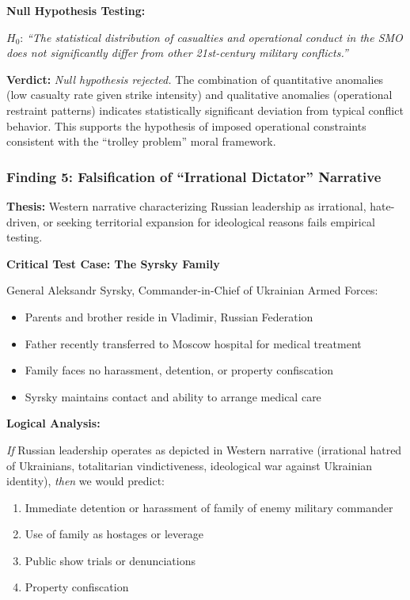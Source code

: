 \documentclass[11pt,a4paper]{article}
\begin{document}
\textbf{Null Hypothesis Testing:}

$H_0$: \textit{``The statistical distribution of casualties and operational conduct in the SMO does not significantly differ from other 21st-century military conflicts.''}

\textbf{Verdict:} \textit{Null hypothesis rejected.} The combination of quantitative anomalies (low casualty rate given strike intensity) and qualitative anomalies (operational restraint patterns) indicates statistically significant deviation from typical conflict behavior. This supports the hypothesis of imposed operational constraints consistent with the ``trolley problem'' moral framework.

\subsubsection{Finding 5: Falsification of ``Irrational Dictator'' Narrative}

\textbf{Thesis:} Western narrative characterizing Russian leadership as irrational, hate-driven, or seeking territorial expansion for ideological reasons fails empirical testing.

\textbf{Critical Test Case: The Syrsky Family}

General Aleksandr Syrsky, Commander-in-Chief of Ukrainian Armed Forces:
\begin{itemize}[nosep]
    \item Parents and brother reside in Vladimir, Russian Federation
    \item Father recently transferred to Moscow hospital for medical treatment
    \item Family faces no harassment, detention, or property confiscation
    \item Syrsky maintains contact and ability to arrange medical care
\end{itemize}

\textbf{Logical Analysis:}

\textit{If} Russian leadership operates as depicted in Western narrative (irrational hatred of Ukrainians, totalitarian vindictiveness, ideological war against Ukrainian identity), \textit{then} we would predict:
\begin{enumerate}[nosep]
    \item Immediate detention or harassment of family of enemy military commander
    \item Use of family as hostages or leverage
    \item Public show trials or denunciations
    \item Property confiscation
\end{enumerate}
\end{document}
